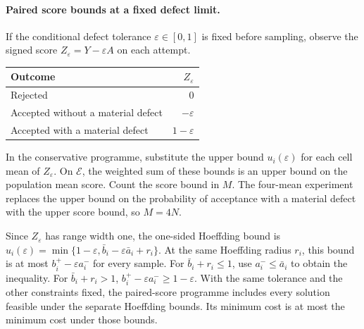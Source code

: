 \documentclass[11pt,reqno]{amsart}
\theoremstyle{definition}
\theoremstyle{remark}
\begin{document}
\paragraph{Paired score bounds at a fixed defect limit.}
If the conditional defect tolerance $\varepsilon\in[0,1]$ is fixed before sampling, observe the signed score
$Z_\varepsilon=Y-\varepsilon A$ on each attempt.
\begin{center}
\begin{tabular}{@{}lr@{}}
\toprule
Outcome & $Z_\varepsilon$\\
\midrule
Rejected & $0$\\
Accepted without a material defect & $-\varepsilon$\\
Accepted with a material defect & $1-\varepsilon$\\
\bottomrule
\end{tabular}
\end{center}
In the conservative programme, substitute the upper bound $u_i(\varepsilon)$ for each cell mean of $Z_\varepsilon$.
On $\mathcal E$, the weighted sum of these bounds is an upper bound on the population mean score.
Count the score bound in $M$. The four-mean experiment replaces the upper bound on the probability of acceptance with a material defect with the upper score bound, so $M=4N$.

Since $Z_\varepsilon$ has range width one, the one-sided Hoeffding bound is
$u_i(\varepsilon)=\min\{1-\varepsilon,\bar b_i-\varepsilon\bar a_i+r_i\}$.
At the same Hoeffding radius $r_i$, this bound is at most $b_i^+-\varepsilon a_i^-$ for every sample.
For $\bar b_i+r_i\le1$, use $a_i^-\le\bar a_i$ to obtain the inequality.
For $\bar b_i+r_i>1$, $b_i^+-\varepsilon a_i^-\ge1-\varepsilon$.
With the same tolerance and the other constraints fixed, the paired-score programme includes every solution feasible under the separate Hoeffding bounds. Its minimum cost is at most the minimum cost under those bounds.
\end{document}
